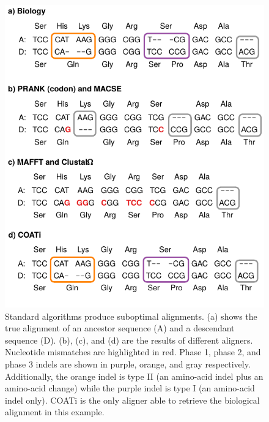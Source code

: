 \documentclass[12pt,letterpaper]{article}
\begin{document}
\begin{figure}[h!]
    \centering%
    \includegraphics[scale=1]{figures/fig-aln.pdf}
    \par
    \caption{
        Standard algorithms produce suboptimal alignments.
        (a) shows the true alignment of an ancestor sequence (A) and a descendant sequence (D).
        (b), (c), and (d) are the results of different aligners.
        Nucleotide mismatches are highlighted in red. Phase 1, phase 2, and phase 3 indels are shown in purple, orange, and gray respectively.
        Additionally, the orange indel is type II (an amino-acid indel plus an amino-acid change) while the purple indel is type I (an amino-acid indel only).
        COATi is the only aligner able to retrieve the biological alignment in this example.
        }
    \label{fig:aln}
\end{figure}
\end{document}
